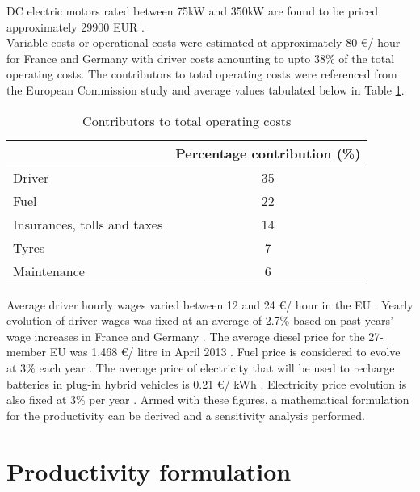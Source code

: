 \documentclass[ExampleMasters.tex]{subfiles}
\begin{document}
		DC electric motors rated between 75kW and 350kW are found to be priced approximately 29900 EUR \cite{EuPLot30Motors}.\\ 

		Variable costs or operational costs were estimated at approximately 80 \euro / hour for France and Germany \cite{EuAECOM1} with driver costs amounting to upto 38\% of the total operating costs. The contributors to total operating costs were referenced from the European Commission study \cite[T.~7b]{EuAECOM2} and average values tabulated below in Table \ref{table:OperatingCostContributors}.\\

		\begin{table}[ht]
			\centering 
			\begin{tabular}{l c}
				\hline
				\ & Percentage contribution (\%)\\
				\hline
			    Driver  & 35\\
			    Fuel  & 22\\
			    Insurances, tolls and taxes & 14\\
			    Tyres & 7\\
			    Maintenance & 6\\
				\hline 
			\end{tabular}
			\caption{Contributors to total operating costs \cite[T.~7b]{EuAECOM2}} 
			\label{table:OperatingCostContributors} 
		\end{table}

		Average driver hourly wages varied between 12 and 24 \euro / hour in the EU \cite[T.~7.2]{EuAECOM1}. Yearly evolution of driver wages was fixed at an average of 2.7\% based on past years' wage increases in France and Germany \cite[T.~7a]{EuAECOM2}. The average diesel price for the 27-member EU was 1.468 \euro / litre in April 2013 \cite[T.~7.3]{EuAECOM1}. Fuel price is considered to evolve at 3\% each year \cite[C.~14]{LongHaulFH}. The average price of electricity that will be used to recharge batteries in plug-in hybrid vehicles is 0.21 \euro / kWh \cite{EUelectricity}. Electricity price evolution is also fixed at 3\% per year \cite[T.~14]{LongHaulFH}. Armed with these figures, a mathematical formulation for the productivity can be derived and a sensitivity analysis performed.  

	\section{Productivity formulation}
\end{document}
